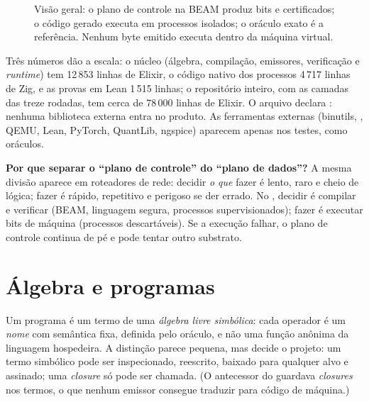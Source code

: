 \begin{figure}[htbp]
\caption{Visão geral: o plano de controle na BEAM produz bits e certificados; o código gerado executa em processos isolados; o oráculo exato é a referência. Nenhum byte emitido executa dentro da máquina virtual.}
\label{fig:arq-visao}
\end{figure}

Três números dão a escala: o núcleo (álgebra, compilação, emissores, verificação e \textit{runtime}) tem 12\,853 linhas de Elixir, o código nativo dos processos 4\,717 linhas de Zig, e as provas em Lean 1\,515 linhas; o repositório inteiro, com as camadas das treze rodadas, tem cerca de 78\,000 linhas de Elixir. O arquivo  declara : nenhuma biblioteca externa entra no produto. As ferramentas externas (binutils, , QEMU, Lean, PyTorch, QuantLib, ngspice) aparecem apenas nos testes, como oráculos.

\begin{graduacao}
\textbf{Por que separar o ``plano de controle'' do ``plano de dados''?} A mesma divisão aparece em roteadores de rede: decidir \emph{o que} fazer é lento, raro e cheio de lógica; fazer é rápido, repetitivo e perigoso se der errado. No \vapor{}, decidir é compilar e verificar (BEAM, linguagem segura, processos supervisionados); fazer é executar bits de máquina (processos descartáveis). Se a execução falhar, o plano de controle continua de pé e pode tentar outro substrato.
\end{graduacao}

\section{Álgebra e programas}\label{sec:arq-algebra}

Um programa \vapor{} é um termo de uma \emph{álgebra livre simbólica}: cada operador é um \emph{nome} com semântica fixa, definida pelo oráculo, e não uma função anônima da linguagem hospedeira. A distinção parece pequena, mas decide o projeto: um termo simbólico pode ser inspecionado, reescrito, baixado para qualquer alvo e assinado; uma \textit{closure} só pode ser chamada. (O antecessor do \vapor{} guardava \textit{closures} nos termos, o que nenhum emissor consegue traduzir para código de máquina.)

